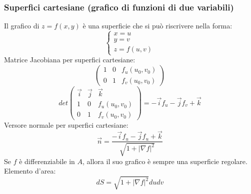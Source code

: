 \subsubsection{Superfici cartesiane (grafico di funzioni di due variabili)}
\begin{tcolorbox}
Il grafico di $z = f(x,y)$ è una superficie che si può riscrivere nella forma:
\[
    \begin{cases}
        x= u\\
        y=v\\
        z = f(u,v)
    \end{cases}
\]
Matrice Jacobiana per superfici cartesiane:
\[
    \left( \begin{matrix}
        1 & 0 & f_u(u_0,v_0) \\
        0 & 1 & f_v(u_0,v_0) 
    \end{matrix} \right)
\]
\[
    det\left( \begin{matrix}
        \vec{i} & \vec{j} & \vec{k} \\
        1 & 0 & f_u(u_0,v_0) \\
        0 & 1 & f_v(u_0,v_0) 
    \end{matrix} \right)= -\vec{i}f_u -\vec{j} f_v + \vec{k}
\]
Versore normale per superfici cartesiane:
\[
    \vec{n} =\frac{-\vec{i}f_u -\vec{j} f_u + \vec{k}}{\sqrt{1 + |\nabla f|^2}}
\]
Se $f$ è differenziabile in $A$, allora il suo grafico è sempre una superficie regolare.\newline
\newline
Elemento d'area:
\[
    dS = \sqrt{1 + |\nabla f|^2} du dv
\]
\end{tcolorbox}
